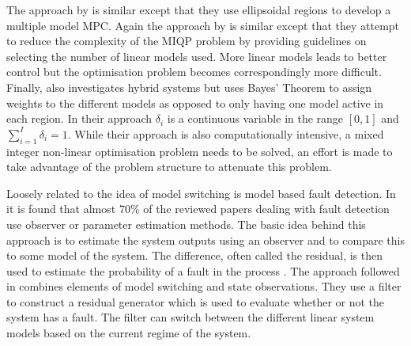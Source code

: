 The approach by \cite{ozkan} is similar except that they use ellipsoidal regions to develop a multiple model MPC. Again the approach by \cite{kvasnica} is similar except that they attempt to reduce the complexity of the MIQP problem by providing guidelines on selecting the number of linear models used. More linear models leads to better control but the optimisation problem becomes correspondingly more difficult. Finally, \cite {nandola} also investigates hybrid systems but uses Bayes' Theorem to assign weights to the different models as opposed to only having one model active in each region. In their approach $\delta_i$ is a continuous variable in the range $[0, 1]$ and $\sum_{i=1}^I \delta_i = 1$. While their approach is also computationally intensive, a mixed integer non-linear optimisation problem needs to be solved, an effort is made to take advantage of the problem structure to attenuate this problem.

Loosely related to the idea of model switching is model based fault detection. In \cite{isermann} it is found that almost 70\% of the reviewed papers dealing with fault detection use observer or parameter estimation methods. The basic idea behind this approach is to estimate the system outputs using an observer and to compare this to some model of the system. The difference, often called the residual, is then used to estimate the probability of a fault in the process \cite{edwards}. The approach followed in \cite{wang} combines elements of model switching and state observations. They use a filter to construct a residual generator which is used to evaluate whether or not the system has a fault. The filter can switch between the different linear system models based on the current regime of the system. 

